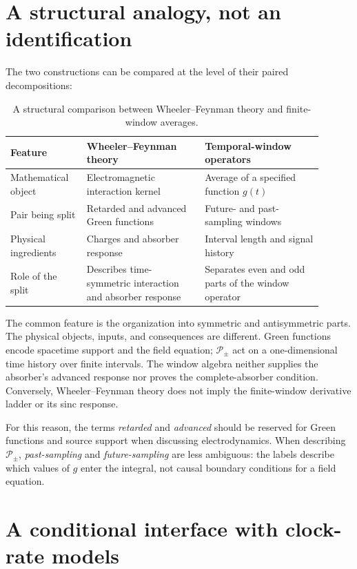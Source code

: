 \documentclass[12pt]{article}
\begin{document}
\section{A structural analogy, not an identification}

The two constructions can be compared at the level of their paired decompositions:
\begin{table}[ht]
  \centering
  \small
  \begin{tabular}{@{}p{0.22\linewidth}p{0.34\linewidth}p{0.34\linewidth}@{}}
    \toprule
    Feature & Wheeler--Feynman theory & Temporal-window operators \\
    \midrule
    Mathematical object & Electromagnetic interaction kernel & Average of a specified function $g(t)$ \\
    Pair being split & Retarded and advanced Green functions & Future- and past-sampling windows \\
    Physical ingredients & Charges and absorber response & Interval length and signal history \\
    Role of the split & Describes time-symmetric interaction and absorber response & Separates even and odd parts of the window operator \\
    \bottomrule
  \end{tabular}
  \caption{A structural comparison between Wheeler--Feynman theory and finite-window averages.}
  \label{tab:absorber-window-comparison}
\end{table}

The common feature is the organization into symmetric and antisymmetric parts. The physical objects, inputs, and consequences are different. Green functions encode spacetime support and the field equation; $\mathcal{P}_{\pm}$ act on a one-dimensional time history over finite intervals. The window algebra neither supplies the absorber's advanced response nor proves the complete-absorber condition. Conversely, Wheeler--Feynman theory does not imply the finite-window derivative ladder or its sinc response.

For this reason, the terms \emph{retarded} and \emph{advanced} should be reserved for Green functions and source support when discussing electrodynamics. When describing $\mathcal{P}_{\pm}$, \emph{past-sampling} and \emph{future-sampling} are less ambiguous: the labels describe which values of $g$ enter the integral, not causal boundary conditions for a field equation.

\section{A conditional interface with clock-rate models}
\end{document}
